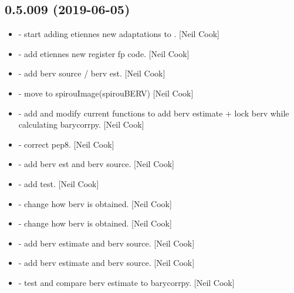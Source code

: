 \documentclass[a4paper,10pt,english]{report}
\begin{document}
\subsection{0.5.009 (2019-06-05)}
\label{\detokenize{misc/changelog:id128}}\begin{itemize}
\item {} 
 - start adding etiennes new adaptations to
. {[}Neil Cook{]}

\item {} 
 - add etiennes new register fp code. {[}Neil Cook{]}

\item {} 
 - add berv source / berv est. {[}Neil Cook{]}

\item {} 
 - move  to spirouImage(spirouBERV)
{[}Neil Cook{]}

\item {} 
 - add  and modify current functions to add
berv estimate + lock berv while calculating barycorrpy. {[}Neil Cook{]}

\item {} 
 - correct pep8. {[}Neil Cook{]}

\item {} 
 - add berv est and berv source. {[}Neil Cook{]}

\item {} 
 - add  test. {[}Neil Cook{]}

\item {} 
 - change how berv is obtained. {[}Neil Cook{]}

\item {} 
 - change how berv is obtained. {[}Neil Cook{]}

\item {} 
 - add berv estimate and berv source. {[}Neil
Cook{]}

\item {} 
 - add berv estimate and berv source. {[}Neil
Cook{]}

\item {} 
 - test and compare berv estimate to
barycorrpy. {[}Neil Cook{]}

\end{itemize}
\end{document}
